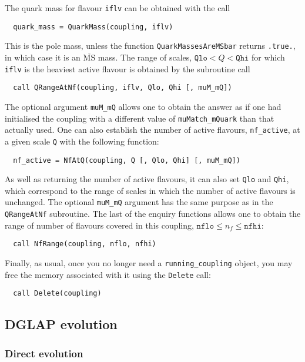 \documentclass[12pt]{article}
\newcommand{\MSbar}{\overline{\mathrm{MS}}}
\newcommand{\ttt}[1]{\texttt{#1}}
\begin{document}
The quark mass for flavour \ttt{iflv} can be obtained with the
call
\begin{lstlisting}
  quark_mass = QuarkMass(coupling, iflv)
\end{lstlisting}
This is the pole mass, unless the function \ttt{QuarkMassesAreMSbar}
returns \ttt{.true.}, in which case it is an $\MSbar$ mass.
%
The range of scales, $\ttt{Qlo} < Q < \ttt{Qhi}$ for which \ttt{iflv}
is the heaviest active flavour is obtained by the subroutine call
\begin{lstlisting}
  call QRangeAtNf(coupling, iflv, Qlo, Qhi [, muM_mQ])
\end{lstlisting}
The optional argument \ttt{muM\_mQ} allows one to obtain the answer as
if one had initialised the coupling with a different value of
\ttt{muMatch\_mQuark} than that actually used. One can also establish
the number of active flavours, \ttt{nf\_active}, at a given scale
\ttt{Q} with the following function:
\begin{lstlisting}
  nf_active = NfAtQ(coupling, Q [, Qlo, Qhi] [, muM_mQ])
\end{lstlisting}
As well as returning the number of active flavours, it can also set
\ttt{Qlo} and \ttt{Qhi}, which correspond to the range of scales in
which the number of active flavours is unchanged. The optional
\ttt{muM\_mQ} argument has the same purpose as in the \ttt{QRangeAtNf}
subroutine. The last of the enquiry functions allows one to obtain the
range of number of flavours covered in this coupling, $\ttt{nflo} \le
n_f \le \ttt{nfhi}$:
\begin{lstlisting}
  call NfRange(coupling, nflo, nfhi)
\end{lstlisting}

Finally, as usual, once you no longer need a \ttt{running\_coupling}
object, you may free the memory associated with it using the
\ttt{Delete} call:
\begin{lstlisting}
  call Delete(coupling)
\end{lstlisting}



\subsection{DGLAP evolution}
\label{sec:dglap-ev}


\subsubsection{Direct evolution}
\label{sec:direct-evolution}
\end{document}
